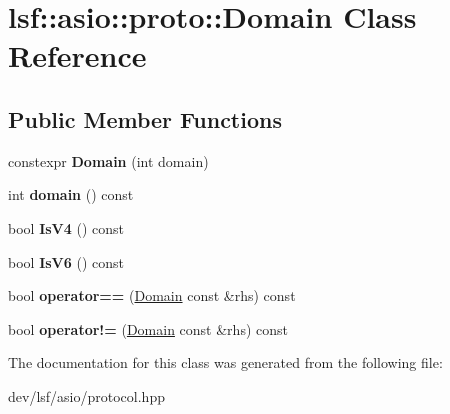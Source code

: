 \hypertarget{classlsf_1_1asio_1_1proto_1_1Domain}{
\section{lsf::asio::proto::Domain Class Reference}
\label{classlsf_1_1asio_1_1proto_1_1Domain}
}
\subsection*{Public Member Functions}
\begin{DoxyCompactItemize}
\item 
\hypertarget{classlsf_1_1asio_1_1proto_1_1Domain_ae19959c75786c36022f1e0293350122e}{
constexpr {\bfseries Domain} (int domain)}
\label{classlsf_1_1asio_1_1proto_1_1Domain_ae19959c75786c36022f1e0293350122e}

\item 
\hypertarget{classlsf_1_1asio_1_1proto_1_1Domain_ae651d4326570e7038e2accaff1b73363}{
int {\bfseries domain} () const }
\label{classlsf_1_1asio_1_1proto_1_1Domain_ae651d4326570e7038e2accaff1b73363}

\item 
\hypertarget{classlsf_1_1asio_1_1proto_1_1Domain_a2939aaba7be3ad9d6c3c1c9f370e271b}{
bool {\bfseries IsV4} () const }
\label{classlsf_1_1asio_1_1proto_1_1Domain_a2939aaba7be3ad9d6c3c1c9f370e271b}

\item 
\hypertarget{classlsf_1_1asio_1_1proto_1_1Domain_a9ef2ab51fccc8324da0f000a25d206c1}{
bool {\bfseries IsV6} () const }
\label{classlsf_1_1asio_1_1proto_1_1Domain_a9ef2ab51fccc8324da0f000a25d206c1}

\item 
\hypertarget{classlsf_1_1asio_1_1proto_1_1Domain_a3f4df058a6e66bc1ddbfa631646c70d7}{
bool {\bfseries operator==} (\hyperlink{classlsf_1_1asio_1_1proto_1_1Domain}{Domain} const \&rhs) const }
\label{classlsf_1_1asio_1_1proto_1_1Domain_a3f4df058a6e66bc1ddbfa631646c70d7}

\item 
\hypertarget{classlsf_1_1asio_1_1proto_1_1Domain_af192debf40c043ea4201c6ab5fc89c3f}{
bool {\bfseries operator!=} (\hyperlink{classlsf_1_1asio_1_1proto_1_1Domain}{Domain} const \&rhs) const }
\label{classlsf_1_1asio_1_1proto_1_1Domain_af192debf40c043ea4201c6ab5fc89c3f}

\end{DoxyCompactItemize}


The documentation for this class was generated from the following file:\begin{DoxyCompactItemize}
\item 
dev/lsf/asio/protocol.hpp\end{DoxyCompactItemize}
